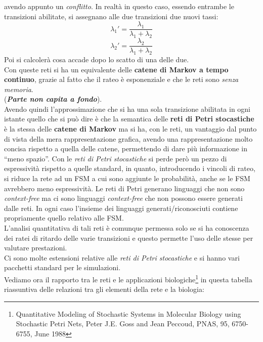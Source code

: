\documentclass[a4paper,12pt, oneside]{book}
\begin{document}
avendo appunto un \textit{conflitto}. In realtà in questo caso, essendo entrambe
le transizioni abilitate, si assegnano alle due transizioni due nuovi tassi:
\[\lambda_1'=\frac{\lambda_1}{\lambda_1+\lambda_2}\]
\[\lambda_2'=\frac{\lambda_2}{\lambda_1+\lambda_2}\]
Poi si calcolerà cosa accade dopo lo scatto di una delle due. \\
Con queste reti si ha un equivalente delle \textbf{catene di Markov a tempo
  continuo}, grazie al fatto che il rateo è esponenziale e che le reti sono
\textit{senza memoria}.\\
(\textbf{\textit{Parte non capita a fondo}}).\\
Avendo quindi l'approssimazione che si ha una sola transizione abilitata in
ogni istante quello che si può dire è che la semantica delle \textbf{reti di
  Petri stocastiche} è la stessa delle \textbf{catene di Markov} ma si ha, con
le reti, un vantaggio dal punto di vista della mera rappresentazione grafica,
avendo una rappresentazione molto concisa rispetto a quella delle catene,
permettendo di dare più informazione in ``meno spazio''. Con le \textit{reti di
  Petri stocastiche} si perde però un pezzo di espressività rispetto a quelle
standard, in quanto, introducendo i vincoli di rateo, si riduce la rete ad un
FSM a cui sono aggiunte le probabilità, anche se le FSM avrebbero meno
espressività. Le reti di Petri generano linguaggi che non sono
\textit{context-free} ma ci sono linguaggi \textit{context-free} che non possono
essere generati dalle reti. In ogni caso l'insieme dei linguaggi
generati/riconosciuti contiene propriamente quello relativo alle FSM. \\
L'analisi quantitativa di tali reti è comunque permessa solo se si ha conoscenza
dei ratei di ritardo delle varie transizioni e questo permette l'uso delle
stesse per valutare prestazioni.\\
Ci sono molte estensioni relative alle \textit{reti di Petri stocastiche} e si
hanno vari pacchetti standard per le simulazioni.\\
Vediamo ora il rapporto tra le reti e le applicazioni
biologiche\footnote{Quantitative Modeling of Stochastic Systems in
  Molecular Biology using Stochastic Petri Nets, Peter J.E. Goss and Jean
  Peccoud, PNAS, 95, 6750-6755, June 1988} in questa tabella riassuntiva delle
relazioni tra gli elementi della rete e la biologia:
\end{document}
